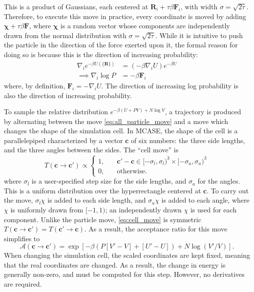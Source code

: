 \documentclass{article}
\begin{document}
This is a product of Gaussians, each centered at $\boldsymbol{R}_i + \tau \beta \boldsymbol{F}_i$, with width $\sigma = \sqrt{2 \tau}$.
Therefore, to execute this move in practice, every coordinate is moved by adding $\boldsymbol{\chi} + \tau \beta \boldsymbol{F}$, where $\boldsymbol{\chi}$ is a random vector whose components are independently drawn from the normal distribution with $\sigma = \sqrt{2 \tau}$.
While it is intuitive to push the particle in the direction of the force exerted upon it, the formal reason for doing so is because this is the direction of increasing probability:
%
\begin{equation}
    \label{eq:increasing_probability}
    \begin{split}
        \nabla_i e^{-\beta U(\{\boldsymbol{R}\})} &= (-\beta \nabla_i U) e^{-\beta U} \\
        \implies \nabla_i \log P &= - \beta \boldsymbol{F}_i
    \end{split}
\end{equation}
%
where, by definition, $\boldsymbol{F}_i = -\nabla_i U$.
The direction of increasing log probability is also the direction of increasing probability.

To sample the relative distribution $e^{-\beta (U + P V) + N \log V}$, a trajectory is produced by alternating between the move \eqref{eq:all_particle_move} and a move which changes the shape of the simulation cell.
In MCASE, the shape of the cell is a parallelepiped characterized by a vector $\boldsymbol{c}$ of six numbers: the three side lengths, and the three angles between the sides.
The ``cell move'' is
%
\begin{equation}
    \label{eq:cell_move}
    T(\boldsymbol{c} \to \boldsymbol{c}') \propto
    \begin{cases}
        1, \quad & \boldsymbol{c}' - \boldsymbol{c} \in [-\sigma_l, \sigma_l)^3 \times [-\sigma_a, \sigma_a)^3 \\
        0, \quad & \text{otherwise}.
    \end{cases}
\end{equation}
%
where $\sigma_l$ is a user-specified step size for the side lengths, and $\sigma_a$ for the angles.
This is a uniform distribution over the hyperrectangle centered at $\boldsymbol{c}$.
To carry out the move, $\sigma_l \chi$ is added to each side length, and $\sigma_a \chi$ is added to each angle, where $\chi$ is uniformly drawn from $[-1, 1)$; an independently drawn $\chi$ is used for each component.
Unlike the particle move, \eqref{eq:cell_move} is symmetric $T(\boldsymbol{c} \to \boldsymbol{c}') = T(\boldsymbol{c}' \to \boldsymbol{c})$.
As a result, the acceptance ratio for this move simplifies to
%
\begin{equation}
    \label{eq:cell_acceptance}
    \mathcal{A}(\boldsymbol{c} \to \boldsymbol{c}') = \exp \left[ -\beta (P [V' - V] + [U' - U]) + N \log(V' / V) \right].
\end{equation}
%
When changing the simulation cell, the scaled coordinates are kept fixed, meaning that the real coordinates are changed.
As a result, the change in energy is generally non-zero, and must be computed for this step.
However, no derivatives are required.
\end{document}
